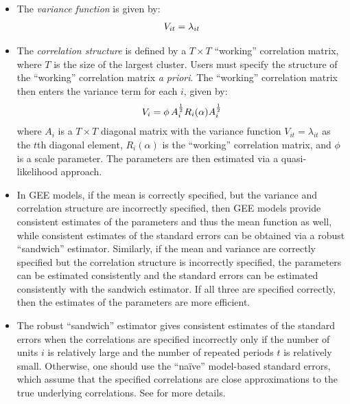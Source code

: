 \documentclass[letterpaper,10pt,english]{sphinxmanual}
\begin{document}
\begin{itemize}
\item {} 
The \emph{variance function} is given by:
\begin{gather}
\begin{split}V_{it} = \lambda_{it}\end{split}\notag
\end{gather}
\item {} 
The \emph{correlation structure} is defined by a \(T \times T\)
“working” correlation matrix, where \(T\) is the size of the
largest cluster. Users must specify the structure of the “working”
correlation matrix \emph{a priori}. The “working” correlation matrix then
enters the variance term for each \(i\), given by:
\begin{gather}
\begin{split}V_{i} = \phi \, A_{i}^{\frac{1}{2}} R_{i}(\alpha) A_{i}^{\frac{1}{2}}\end{split}\notag
\end{gather}
where \(A_{i}\) is a \(T \times T\) diagonal matrix with the
variance function \(V_{it} = \lambda_{it}\) as the \(t\)th
diagonal element, \(R_{i}(\alpha)\) is the “working” correlation
matrix, and \(\phi\) is a scale parameter. The parameters are
then estimated via a quasi-likelihood approach.

\item {} 
In GEE models, if the mean is correctly specified, but the variance
and correlation structure are incorrectly specified, then GEE models
provide consistent estimates of the parameters and thus the mean
function as well, while consistent estimates of the standard errors
can be obtained via a robust “sandwich” estimator. Similarly, if the
mean and variance are correctly specified but the correlation
structure is incorrectly specified, the parameters can be estimated
consistently and the standard errors can be estimated consistently
with the sandwich estimator. If all three are specified correctly,
then the estimates of the parameters are more efficient.

\item {} 
The robust “sandwich” estimator gives consistent estimates of the
standard errors when the correlations are specified incorrectly only
if the number of units \(i\) is relatively large and the number
of repeated periods \(t\) is relatively small. Otherwise, one
should use the “naïve” model-based standard errors, which assume that
the specified correlations are close approximations to the true
underlying correlations. See for more details.

\end{itemize}
\end{document}
